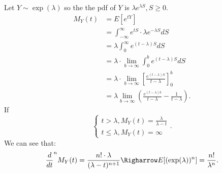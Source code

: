\documentclass[a4paper]{article}
\begin{document}
\begin{note}
Let $Y \sim \exp(\lambda)$ so the the pdf of  $Y$ is  $\lambda e^{\lambda S}, S \geq 0$.
\begin{align*}
  M_{Y}(t) &= E[e^{tY}] \\
           &= \int_{-\infty}^{\infty} e^{tS} \cdot \lambda e^{-\lambda S} dS \\
           &= \lambda \int_{0}^{\infty} e^{(t - \lambda) S} dS \\
           &= \lambda \cdot \lim_{b \to \infty} \int_{0}^{b} e^{(t - \lambda) S} dS \\
           &= \lambda \cdot \lim_{b \to \infty} [\frac{e^{(t - \lambda) S}}{t-\lambda}]_0^{b}\\
           &= \lambda \lim_{b \to \infty} (\frac{e^{(t-\lambda)b}}{t -\lambda }- \frac{1}{t- \lambda}) 
.\end{align*}
If  \[
\begin{cases}
  t > \lambda , M_{Y}(t) = \frac{\lambda}{\lambda - t} \\
  t \leq \lambda, M_{Y}(t) = \infty
\end{cases}
.\] 
We can see that:
\[
  \frac{d}{dt}^{n} M_{Y}(t) = \frac{n! \cdot \lambda}{(\lambda -t )^{n+1}} \Righarrow E[(\exp(\lambda))^{n}] = \frac{n!}{\lambda^{n}}
.\] 
\end{note}
\end{document}

